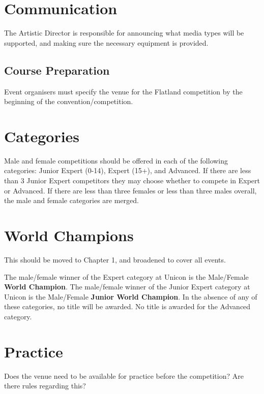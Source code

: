 \section{Communication}

The Artistic Director is responsible for announcing what media types will be supported, and making sure the necessary equipment is provided.

\subsection{Course Preparation}

Event organisers must specify the venue for the Flatland competition by the beginning of the convention/competition.

\section{Categories}
Male and female competitions should be offered in each of the following categories: Junior Expert (0-14), Expert (15+), and Advanced.
If there are less than 3 Junior Expert competitors they may choose whether to compete in Expert or Advanced.
If there are less than three females or less than three males overall, the male and female categories are merged.

\section{World Champions}

\begin{framed}
This should be moved to Chapter 1, and broadened to cover all events.
\end{framed}

The male/female winner of the Expert category at Unicon is the Male/Female \textbf{World Champion}.
The male/female winner of the Junior Expert category at Unicon is the Male/Female \textbf{Junior World Champion}.
In the absence of any of these categories, no title will be awarded.
No title is awarded for the Advanced category.

\section{Practice}

\begin{framed}
Does the venue need to be available for practice before the competition? Are there rules regarding this?
\end{framed}


